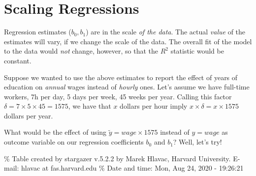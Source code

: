 \documentclass[]{book}
\newenvironment{tip}{\begin{tcolorbox}[colback=green!5!white,colframe=green]}{\end{tcolorbox}}
\begin{document}
\hypertarget{scaling-regressions}{%
\section{Scaling Regressions}\label{scaling-regressions}}

\begin{tip}
Regression estimates (\(b_0, b_1\)) are in the scale \emph{of the data}.
The actual \emph{value} of the estimates will vary, if we change the
scale of the data. The overall fit of the model to the data would
\emph{not} change, however, so that the \(R^2\) statistic would be
constant.
\end{tip}

Suppose we wanted to use the above estimates to report the effect of years of education on \emph{annual} wages instead of \emph{hourly} ones. Let's assume we have full-time workers, 7h per day, 5 days per week, 45 weeks per year. Calling this factor \(\delta = 7 \times 5 \times 45 = 1575\), we have that \(x\) dollars per hour imply \(x \times \delta = x \times 1575\) dollars per year.

What would be the effect of using \(\tilde{y} = wage \times 1575\) instead of \(y = wage\) as outcome variable on our regression coefficients \(b_0\) and \(b_1\)? Well, let's try!

\% Table created by stargazer v.5.2.2 by Marek Hlavac, Harvard University. E-mail: hlavac at fas.harvard.edu
\% Date and time: Mon, Aug 24, 2020 - 19:26:21
\end{document}
